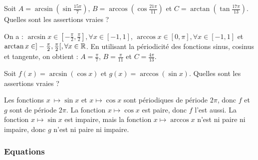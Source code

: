 \begin{question} 
Soit $A=\arcsin (\sin \frac{15\pi}{7})$, $B=\arccos (\cos \frac{21\pi}{11})$ et $C=\arctan (\tan \frac{17\pi}{13})$.  Quelles sont les assertions vraies ?

\begin{answers}



\end{answers}
\begin{explanations}
On a : $\arcsin x \in [-\frac{\pi}{2},\frac{\pi}{2}], \forall x \in [-1,1]$,   $\arccos x \in [0,\pi], \forall x\in [-1,1]$ et $\arctan x \in ]-\frac{\pi}{2},\frac{\pi}{2}[, \forall x \in \mathbb{R}$. En utilisant la périodicité des fonctions sinus, cosinus et tangente, on obtient : $A=\frac{\pi}{7}$, $B=\frac{\pi}{11}$ et $C=\frac{ 4\pi}{13}$.
\end{explanations}


\end{question}





\begin{question} 
Soit $f(x)=  \arcsin (\cos  x)$ et  $ g(x)= \arccos (\sin x) $. Quelles sont les assertions vraies ?
\begin{answers}



\end{answers}
\begin{explanations}
Les fonctions $x\ \mapsto   \sin x$ et $x  \mapsto  \cos  x$ sont périodiques de période $2\pi$, donc $f$ et $g$ sont de période $2\pi$. La fonction $x  \mapsto  \cos  x$  est paire, donc $f$ l'est aussi. La fonction $x  \mapsto  \sin   x$ est impaire, mais la fonction $x  \mapsto   \arccos  x$ n'est ni paire ni impaire, donc $g$ n'est ni paire ni impaire.
\end{explanations}

\end{question}



\subsubsection{Equations }



